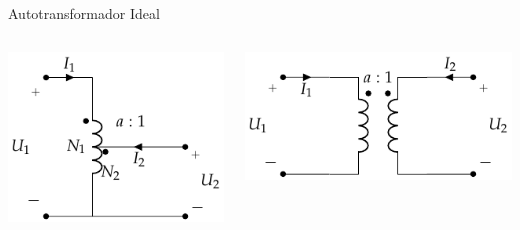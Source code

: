 \documentclass[aspectratio=169, usenames,svgnames,dvipsnames]{beamer}
\begin{document}
\begin{frame}[label={sec:org03abcfb}]{Autotransformador Ideal}
\begin{columns}
\begin{column}[b]{0.5\columnwidth}
\begin{center}
\includegraphics[width=.9\linewidth]{../figs/AutoTrafoIdeal.pdf}
\end{center}
\end{column}
\begin{column}[b]{0.5\columnwidth}
\begin{center}
\includegraphics[width=.9\linewidth]{../figs/Trafo_Ideal.pdf}
\end{center}
\end{column}
\end{columns}
\end{frame}
\end{document}
